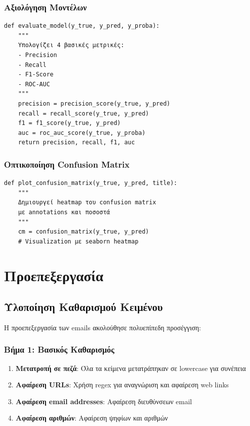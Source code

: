\documentclass[12pt,a4paper,twoside]{book}
\begin{document}
\subsubsection{Αξιολόγηση Μοντέλων}

\begin{tcolorbox}[myCustomStyle={Model Evaluation Function}]
    \begin{lstlisting}[style=myPythonStyle]
def evaluate_model(y_true, y_pred, y_proba):
    """
    Υπολογίζει 4 βασικές μετρικές:
    - Precision
    - Recall
    - F1-Score
    - ROC-AUC
    """
    precision = precision_score(y_true, y_pred)
    recall = recall_score(y_true, y_pred)
    f1 = f1_score(y_true, y_pred)
    auc = roc_auc_score(y_true, y_proba)
    return precision, recall, f1, auc
\end{lstlisting}
\end{tcolorbox}

\subsubsection{Οπτικοποίηση Confusion Matrix}

\begin{tcolorbox}[myCustomStyle={Confusion Matrix Visualization}]
    \begin{lstlisting}[style=myPythonStyle]
def plot_confusion_matrix(y_true, y_pred, title):
    """
    Δημιουργεί heatmap του confusion matrix
    με annotations και ποσοστά
    """
    cm = confusion_matrix(y_true, y_pred)
    # Visualization με seaborn heatmap
\end{lstlisting}
\end{tcolorbox}

\section{Προεπεξεργασία}

\subsection{Υλοποίηση Καθαρισμού Κειμένου}

Η προεπεξεργασία των emails ακολούθησε πολυεπίπεδη προσέγγιση:

\subsubsection{Βήμα 1: Βασικός Καθαρισμός}

\begin{enumerate}
    \item \textbf{Μετατροπή σε πεζά}: Όλα τα κείμενα μετατράπηκαν σε lowercase για συνέπεια
    \item \textbf{Αφαίρεση URLs}: Χρήση regex για αναγνώριση και αφαίρεση web links
    \item \textbf{Αφαίρεση email addresses}: Αφαίρεση διευθύνσεων email
    \item \textbf{Αφαίρεση αριθμών}: Αφαίρεση ψηφίων και αριθμών
\end{enumerate}
\end{document}
